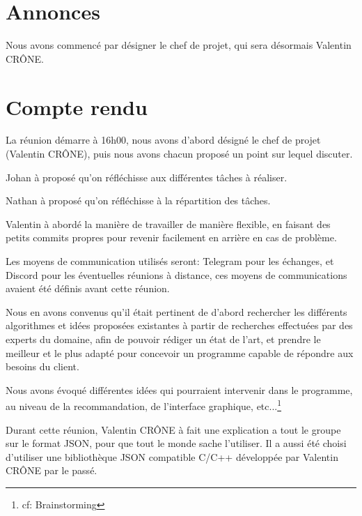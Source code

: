 \documentclass[11pt]{meetingmins}
\begin{document}
\maketitle

\section {Annonces}

\begin{hiddenitems}
	\item Nous avons commencé par désigner le chef de projet, qui sera désormais Valentin CRÔNE.
\end{hiddenitems}

\section {Compte rendu}
\begin{flushleft}
	La réunion démarre à 16h00, nous avons d'abord désigné le chef de projet (Valentin CRÔNE), puis nous avons chacun proposé un point sur lequel discuter.
	\begin{items}
		\item Johan à proposé qu'on réfléchisse aux différentes tâches à réaliser.
		\item Nathan à proposé qu'on réfléchisse à la répartition des tâches.
		\item Valentin à abordé la manière de travailler de manière flexible, en faisant des petits commits propres pour revenir facilement en arrière en cas de problème.
	\end{items}
	Les moyens de communication utilisés seront: Telegram pour les échanges, et Discord pour les éventuelles réunions à distance, ces moyens de communications avaient été définis avant cette réunion.\par


	Nous en avons convenus qu'il était pertinent de d'abord rechercher les différents algorithmes et idées proposées existantes à partir de recherches effectuées par des experts du domaine, afin de pouvoir rédiger un état de l'art, et prendre le meilleur et le plus adapté pour concevoir un programme capable de répondre aux besoins du client.
	\par
	Nous avons évoqué différentes idées qui pourraient intervenir dans le programme, au niveau de la recommandation, de l'interface graphique, etc...\footnote{cf: Brainstorming}

	\par
	Durant cette réunion, Valentin CRÔNE à fait une explication a tout le groupe sur le format JSON, pour que tout le monde sache l'utiliser. Il a aussi été choisi d'utiliser une bibliothèque JSON compatible C/C++ développée par Valentin CRÔNE par le passé.
\end{flushleft}
\end{document}
